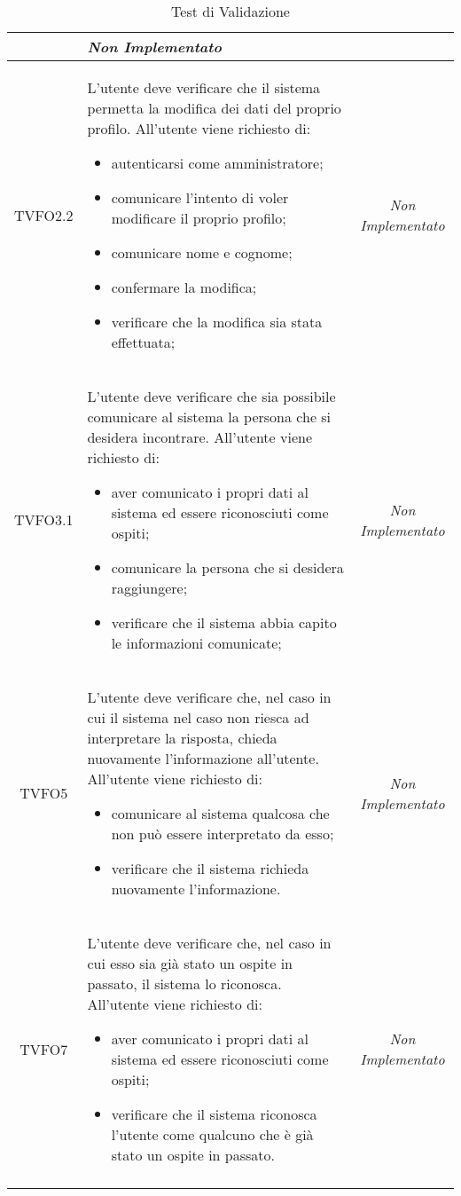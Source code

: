 \begin{longtable}{|c|>{}m{8cm}|c|}
\begin{itemize}
\end{itemize} & \textit{Non Implementato}\\ \hline
\hypertarget{TVFO2.2}{TVFO2.2} & L'utente deve verificare che il sistema permetta la modifica dei dati del proprio profilo. All'utente viene richiesto di:
\begin{itemize}
\item autenticarsi come amministratore;
\item comunicare l'intento di voler modificare il proprio profilo;
\item comunicare nome e cognome;
\item confermare la modifica;
\item verificare che la modifica sia stata effettuata;
\end{itemize}
 & \textit{Non Implementato}\\ \hline
\hypertarget{TVFO3.1}{TVFO3.1} & L'utente deve verificare che sia possibile comunicare al sistema la persona che si desidera incontrare. All'utente viene richiesto di:
\begin{itemize}
\item aver comunicato i propri dati al sistema ed essere riconosciuti come ospiti;
\item comunicare la persona che si desidera raggiungere;
\item verificare che il sistema abbia capito le informazioni comunicate;
\end{itemize} & \textit{Non Implementato}\\ \hline
\hypertarget{TVFO5}{TVFO5} & L'utente deve verificare che, nel caso in cui il sistema nel caso non riesca ad interpretare la risposta, chieda nuovamente l'informazione all'utente. All'utente viene richiesto di:
\begin{itemize}
\item comunicare al sistema qualcosa che non può essere interpretato da esso;
\item verificare che il sistema richieda nuovamente l'informazione.
\end{itemize} & \textit{Non Implementato}\\ \hline
\hypertarget{TVFO7}{TVFO7} & L'utente deve verificare che, nel caso in cui esso sia già stato un ospite in passato, il sistema lo riconosca. All'utente viene richiesto di:
\begin{itemize}
\item aver comunicato i propri dati al sistema ed essere riconosciuti come ospiti;
\item verificare che il sistema riconosca l'utente come qualcuno che è già stato un ospite in passato.
\end{itemize}
 & \textit{Non Implementato}\\ \hline
\caption[Test di Validazione]{Test di Validazione}
\label{tabella:test0}
\end{longtable}
\clearpage

